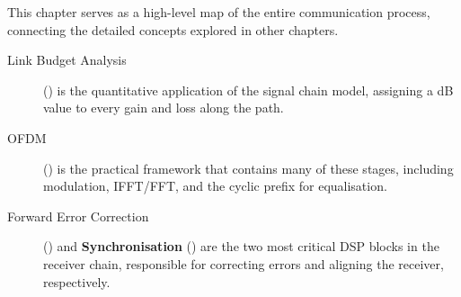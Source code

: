 \begin{importantbox}[title={Further Reading}]
    This chapter serves as a high-level map of the entire communication process, connecting the detailed concepts explored in other chapters.
    \begin{description}
        \item[Link Budget Analysis] () is the quantitative application of the signal chain model, assigning a dB value to every gain and loss along the path.
        \item[OFDM] () is the practical framework that contains many of these stages, including modulation, IFFT/FFT, and the cyclic prefix for equalisation.
        \item[Forward Error Correction] () and \textbf{Synchronisation} () are the two most critical DSP blocks in the receiver chain, responsible for correcting errors and aligning the receiver, respectively.
    \end{description}
\end{importantbox}